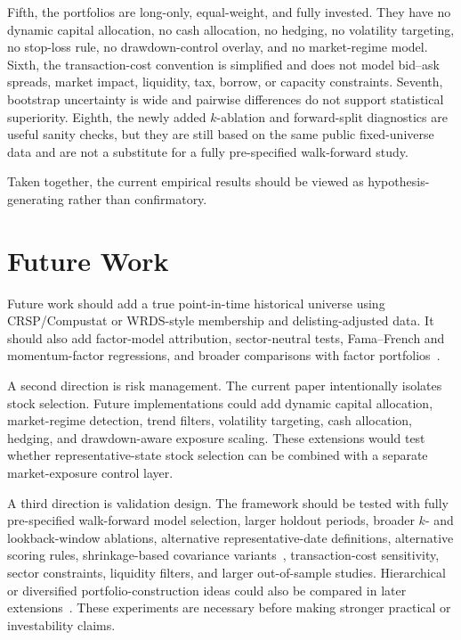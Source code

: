 \documentclass[runningheads]{llncs}
\begin{document}
Fifth, the portfolios are long-only, equal-weight, and fully invested. They have no dynamic capital allocation, no cash allocation, no hedging, no volatility targeting, no stop-loss rule, no drawdown-control overlay, and no market-regime model. Sixth, the transaction-cost convention is simplified and does not model bid--ask spreads, market impact, liquidity, tax, borrow, or capacity constraints. Seventh, bootstrap uncertainty is wide and pairwise differences do not support statistical superiority. Eighth, the newly added $k$-ablation and forward-split diagnostics are useful sanity checks, but they are still based on the same public fixed-universe data and are not a substitute for a fully pre-specified walk-forward study.

Taken together, the current empirical results should be viewed as hypothesis-generating rather than confirmatory.

\section{Future Work}

Future work should add a true point-in-time historical universe using CRSP/Compustat or WRDS-style membership and delisting-adjusted data. It should also add factor-model attribution, sector-neutral tests, Fama--French and momentum-factor regressions, and broader comparisons with factor portfolios~\cite{fama1993}.

A second direction is risk management. The current paper intentionally isolates stock selection. Future implementations could add dynamic capital allocation, market-regime detection, trend filters, volatility targeting, cash allocation, hedging, and drawdown-aware exposure scaling. These extensions would test whether representative-state stock selection can be combined with a separate market-exposure control layer.

A third direction is validation design. The framework should be tested with fully pre-specified walk-forward model selection, larger holdout periods, broader $k$- and lookback-window ablations, alternative representative-date definitions, alternative scoring rules, shrinkage-based covariance variants~\cite{ledoit2004}, transaction-cost sensitivity, sector constraints, liquidity filters, and larger out-of-sample studies. Hierarchical or diversified portfolio-construction ideas could also be compared in later extensions~\cite{lopezdeprado2016}. These experiments are necessary before making stronger practical or investability claims.
\end{document}
